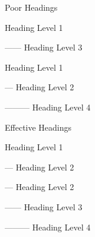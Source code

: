 \documentclass[presentation]{beamer}
\begin{document}
\begin{frame}[label={sec:orga709468}]{Poor Headings}
\begin{block}{Heading Level 1}
\begin{block}{------ Heading Level 3}
\end{block}
\end{block}
\begin{block}{Heading Level 1}
\begin{block}{--- Heading Level 2}
\begin{block}{--------- Heading Level 4}
\end{block}
\end{block}
\end{block}
\end{frame}
\begin{frame}[label={sec:orgf438459}]{Effective Headings}
\begin{block}{Heading Level 1}
\begin{block}{--- Heading Level 2}
\end{block}
\begin{block}{--- Heading Level 2}
\begin{block}{------ Heading Level 3}
\begin{block}{--------- Heading Level 4}
\end{block}
\end{block}
\end{block}
\end{block}
\end{frame}
\end{document}
